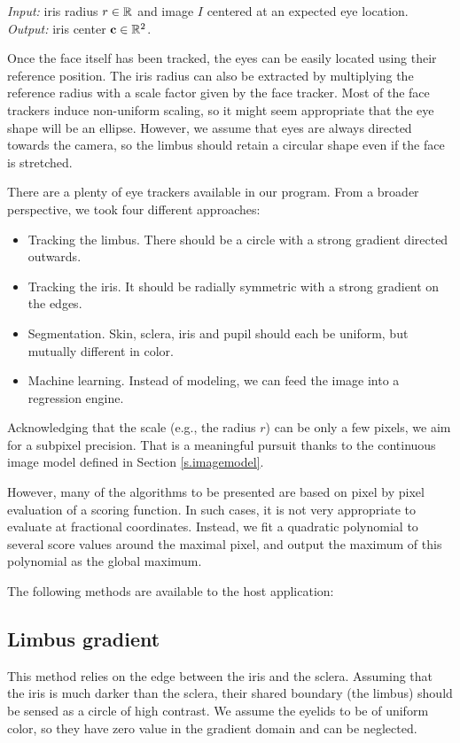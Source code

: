 \textit{Input:} iris radius $r \in \mathbb{R}$ and image $I$ centered at an expected eye location.\\
\textit{Output:} iris center $\mathbf{c} \in \mathbb{R}^2$.\\


Once the face itself has been tracked, the eyes can be easily located using their reference position.
The iris radius can also be extracted by multiplying the reference radius with a scale factor given by the face tracker.
Most of the face trackers induce non-uniform scaling, so it might seem appropriate that the eye shape will be an ellipse.
However, we assume that eyes are always directed towards the camera, so the limbus should retain a circular shape even if the face is stretched.

There are a plenty of eye trackers available in our program.
From a broader perspective, we took four different approaches:
\begin{itemize}
\item Tracking the limbus. There should be a circle with a strong gradient directed outwards.
\item Tracking the iris. It should be radially symmetric with a strong gradient on the edges.
\item Segmentation. Skin, sclera, iris and pupil should each be uniform, but mutually different in color.
\item Machine learning. Instead of modeling, we can feed the image into a regression engine.
\end{itemize}

Acknowledging that the scale (e.g., the radius $r$) can be only a few pixels, we aim for a subpixel precision.
That is a meaningful pursuit thanks to the continuous image model defined in Section \ref{s.imagemodel}.

However, many of the algorithms to be presented are based on pixel by pixel evaluation of a scoring function.
In such cases, it is not very appropriate to evaluate at fractional coordinates.
Instead, we fit a quadratic polynomial to several score values around the maximal pixel, and output the maximum of this polynomial as the global maximum.

The following methods are available to the host application:

\subsection{Limbus gradient}
This method relies on the edge between the iris and the sclera.
Assuming that the iris is much darker than the sclera, their shared boundary (the limbus) should be sensed as a circle of high contrast.
We assume the eyelids to be of uniform color, so they have zero value in the gradient domain and can be neglected.

